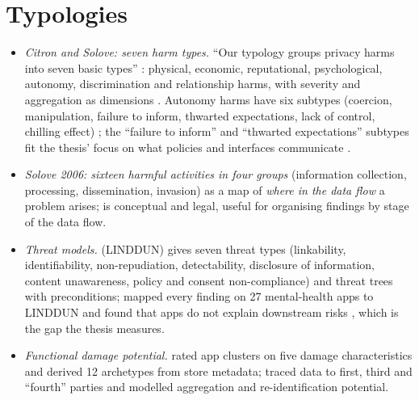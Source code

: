 \section{Typologies}
\begin{itemize}
\item \emph{Citron and Solove: seven harm types.} ``Our typology groups privacy harms into seven basic types'' : physical, economic, reputational, psychological, autonomy, discrimination and relationship harms, with severity and aggregation as dimensions . Autonomy harms have six subtypes (coercion, manipulation, failure to inform, thwarted expectations, lack of control, chilling effect) ; the ``failure to inform'' and ``thwarted expectations'' subtypes fit the thesis' focus on what policies and interfaces communicate .
\item \emph{Solove 2006: sixteen harmful activities in four groups} (information collection, processing, dissemination, invasion) as a map of \emph{where in the data flow} a problem arises;  is conceptual and legal, useful for organising findings by stage of the data flow.
\item \emph{Threat models.}  (LINDDUN) gives seven threat types (linkability, identifiability, non-repudiation, detectability, disclosure of information, content unawareness, policy and consent non-compliance) and threat trees with preconditions;  mapped every finding on 27 mental-health apps to LINDDUN and found that apps do not explain downstream risks , which is the gap the thesis measures.
\item \emph{Functional damage potential.}  rated app clusters on five damage characteristics and derived 12 archetypes from store metadata;  traced data to first, third and ``fourth'' parties and modelled aggregation and re-identification potential.
\end{itemize}

